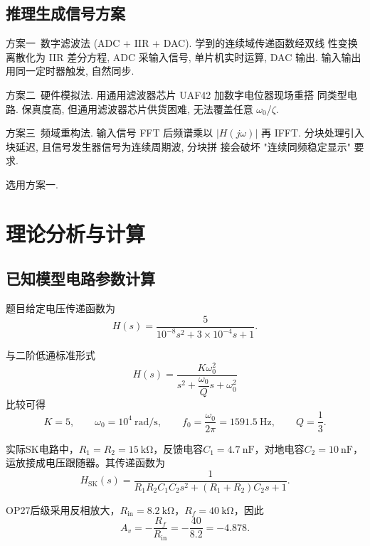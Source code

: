 \documentclass[a4paper]{article}
\begin{document}
\subsection{推理生成信号方案}

方案一\ 数字滤波法 (ADC + IIR + DAC). 学到的连续域传递函数经双线
性变换离散化为 IIR 差分方程, ADC 采输入信号, 单片机实时运算, DAC
输出. 输入输出用同一定时器触发, 自然同步.

方案二\ 硬件模拟法. 用通用滤波器芯片 UAF42 加数字电位器现场重搭
同类型电路. 保真度高, 但通用滤波器芯片供货困难, 无法覆盖任意
$\omega_{0}$/$\zeta$.

方案三\ 频域重构法. 输入信号 FFT 后频谱乘以 $|H(j\omega)|$ 再
IFFT. 分块处理引入块延迟, 且信号发生器信号为连续周期波, 分块拼
接会破坏 "连续同频稳定显示" 要求.

选用方案一.


\newpage
\section{理论分析与计算}

\subsection{已知模型电路参数计算}

题目给定电压传递函数为
\begin{equation}
H(s)=\frac{5}{10^{-8}s^2+3\times10^{-4}s+1}.
\label{eq:targetH}
\end{equation}

与二阶低通标准形式
\begin{equation}
H(s)=\frac{K\omega_0^2}{s^2+\dfrac{\omega_0}{Q}s+\omega_0^2}
\end{equation}
比较可得
\begin{equation}
K=5,\qquad \omega_0=10^4~\mathrm{rad/s},\qquad f_0=\frac{\omega_0}{2\pi}=1591.5~\mathrm{Hz},\qquad Q=\frac{1}{3}.
\end{equation}

实际SK电路中，$R_1=R_2=15~\mathrm{k\Omega}$，反馈电容$C_1=4.7~\mathrm{nF}$，对地电容$C_2=10~\mathrm{nF}$，运放接成电压跟随器。其传递函数为
\begin{equation}
H_{\mathrm{SK}}(s)=\frac{1}{R_1R_2C_1C_2s^2+(R_1+R_2)C_2s+1}.
\end{equation}

OP27后级采用反相放大，$R_{\mathrm{in}}=8.2~\mathrm{k\Omega}$，$R_f=40~\mathrm{k\Omega}$，因此
\begin{equation}
A_v=-\frac{R_f}{R_{\mathrm{in}}}=-\frac{40}{8.2}=-4.878.
\end{equation}
\end{document}
